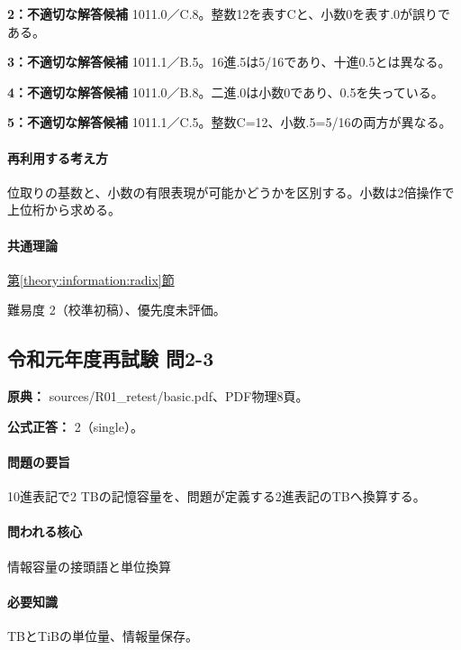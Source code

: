 \noindent\textbf{2：不適切な解答候補} 1011.0／C.8。整数12を表すCと、小数0を表す.0が誤りである。\par

\noindent\textbf{3：不適切な解答候補} 1011.1／B.5。16進.5は5/16であり、十進0.5とは異なる。\par

\noindent\textbf{4：不適切な解答候補} 1011.0／B.8。二進.0は小数0であり、0.5を失っている。\par

\noindent\textbf{5：不適切な解答候補} 1011.1／C.5。整数C=12、小数.5=5/16の両方が異なる。\par

\paragraph{再利用する考え方} 位取りの基数と、小数の有限表現が可能かどうかを区別する。小数は2倍操作で上位桁から求める。

\paragraph{共通理論} \hyperref[theory:information:radix]{第\ref*{theory:information:radix}節}

\par 難易度 2（校準初稿）、優先度未評価。

\subsection{令和元年度再試験 問2-3}
\label{q:r01-ret-basic-2-3}

\noindent\textbf{原典：} sources/R01\_retest/basic.pdf、PDF物理8頁。

\textbf{公式正答：} 2（single）。

\paragraph{問題の要旨} 10進表記で2 TBの記憶容量を、問題が定義する2進表記のTBへ換算する。

\paragraph{問われる核心} 情報容量の接頭語と単位換算

\paragraph{必要知識} TBとTiBの単位量、情報量保存。

